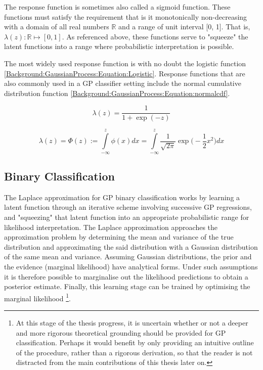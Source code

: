 			The response function is sometimes also called a sigmoid function. These functions must satisfy the requirement that is it monotonically non-decreasing with a domain of all real numbers $\mathbb{R}$ and a range of unit interval [0, 1]. That is, $\lambda(z): \mathbb{R} \mapsto [0, 1]$. As referenced above, these functions serve to "squeeze" the latent functions into a range where probabilistic interpretation is possible.
			
			The most widely used response function is with no doubt the logistic function \eqref{Background:GaussianProcess:Equation:Logistic}. Response functions that are also commonly used in a GP classifier setting include the normal cumulative distribution function \eqref{Background:GaussianProcess:Equation:normalcdf}.
			
			\begin{equation}
				\lambda(z) = \frac{1}{1 + \exp(-z)}
			\label{Background:GaussianProcess:Equation:Logistic}
			\end{equation}
			
			\begin{equation}
				\lambda(z) = \Phi(z) := \int\limits_{-\infty}^{z} \phi(x) dx =  \int\limits_{-\infty}^{z} \frac{1}{\sqrt{2 \pi}} \exp\Big(- \frac{1}{2} x^{2}\Big) dx
			\label{Background:GaussianProcess:Equation:normalcdf}
			\end{equation}
			
		\subsection{Binary Classification}
		
			The Laplace approximation for GP binary classification works by learning a latent function through an iterative scheme involving successive GP regressions, and "squeezing" that latent function into an appropriate probabilistic range for likelihood interpretation. The Laplace approximation approaches the approximation problem by determining the mean and variance of the true distribution and approximating the said distribution with a Gaussian distribution of the same mean and variance. Assuming Gaussian distributions, the prior and the evidence (marginal likelihood) have analytical forms. Under such assumptions it is therefore possible to marginalise out the likelihood predictions to obtain a posterior estimate. Finally, this learning stage can be trained by optimising the marginal likelihood \footnote{{\color{BurntOrange} At this stage of the thesis progress, it is uncertain whether or not a deeper and more rigorous theoretical grounding should be provided for GP classification. Perhaps it would benefit by only providing an intuitive outline of the procedure, rather than a rigorous derivation, so that the reader is not distracted from the main contributions of this thesis later on.}}.
			
